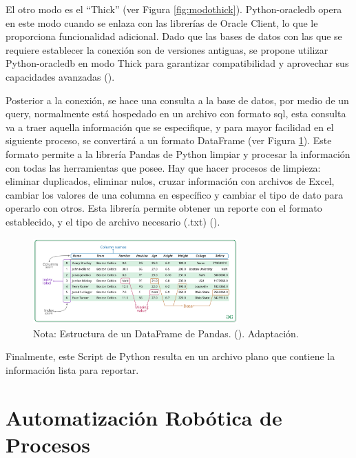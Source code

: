 \documentclass[letter,oneside,12pt,spanish]{report}
\begin{document}
\noindent El otro modo es el “Thick” (ver Figura \ref{fig:modothick}). Python-oracledb opera en este modo cuando se enlaza con las librerías de Oracle Client, lo que le proporciona funcionalidad adicional. Dado que las bases de datos con las que se requiere establecer la conexión son de versiones antiguas, se propone utilizar Python-oracledb en modo Thick para garantizar compatibilidad y aprovechar sus capacidades avanzadas (\cite{oracle2024python}).


\noindent Posterior a la conexión, se hace una consulta a la base de datos, por medio de un query, normalmente está hospedado en un archivo con formato sql, esta consulta va a traer aquella información que se especifique, y para mayor facilidad en el siguiente proceso, se convertirá a un formato DataFrame (ver Figura \ref{fig:pandas}). Este formato permite a la librería Pandas de Python limpiar y procesar la información con todas las herramientas que posee. Hay que hacer procesos de limpieza: eliminar duplicados, eliminar nulos, cruzar información con archivos de Excel, cambiar los valores de una columna en específico y cambiar el tipo de dato para operarlo con otros. Esta librería permite obtener un reporte con el formato establecido, y el tipo de archivo necesario (.txt) (\cite{pandas2024}).

\begin{figure}[ht]
    \centering
    \includegraphics[width=0.7\textwidth]{Figs/pandas.png}
    \label{fig:pandas}
    \\Nota:  Estructura de un DataFrame de Pandas. (\cite{pandas2024}). Adaptación.
\end{figure}



\noindent Finalmente, este Script de Python resulta en un archivo plano que contiene la información lista para reportar.


\section{Automatización Robótica de Procesos}
\end{document}
